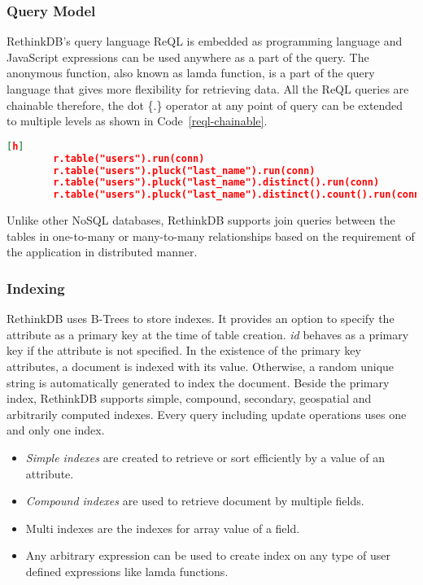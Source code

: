 \subsubsection{Query Model}
RethinkDB's query language ReQL is embedded as programming language and JavaScript expressions can be used anywhere as a part of the query. The anonymous function, also known as lamda function, is a part of the query language that gives more flexibility for retrieving data. All the ReQL queries are chainable therefore, the dot \{.\} operator at any point of query can be extended to multiple levels as shown in Code~\ref{reql-chainable}.
	\begin{lstlisting}[language=JSON,caption=Chainable Query in ReQL, label=reql-chainable, xleftmargin=-40pt][h]
		r.table("users").run(conn)
		r.table("users").pluck("last_name").run(conn)
		r.table("users").pluck("last_name").distinct().run(conn)
		r.table("users").pluck("last_name").distinct().count().run(conn)
	\end{lstlisting} 

Unlike other NoSQL databases, RethinkDB supports join queries between the tables in one-to-many or many-to-many relationships based on the requirement of the application in distributed manner. 

\subsubsection{Indexing}
	RethinkDB uses B-Trees to store indexes. It provides an option to specify the attribute as a primary key at the time of table creation. \textit{id} behaves as a primary key if the attribute is not specified. In the existence of the primary key attributes, a document is indexed with its value. Otherwise, a random unique string is automatically generated to index the document.  Beside the primary index, RethinkDB supports simple, compound, secondary, geospatial  and arbitrarily computed indexes. Every query including update operations uses one and only one index. 
	\begin{itemize}
		\item \textit{Simple indexes} are created to retrieve or sort efficiently by a value of an attribute.
		\item \textit{Compound indexes} are used to retrieve document by multiple fields. 
		\item Multi indexes are the indexes for array value of a field. 
		\item Any arbitrary expression can be used to create index on any type of user defined expressions like lamda functions.
	\end{itemize}